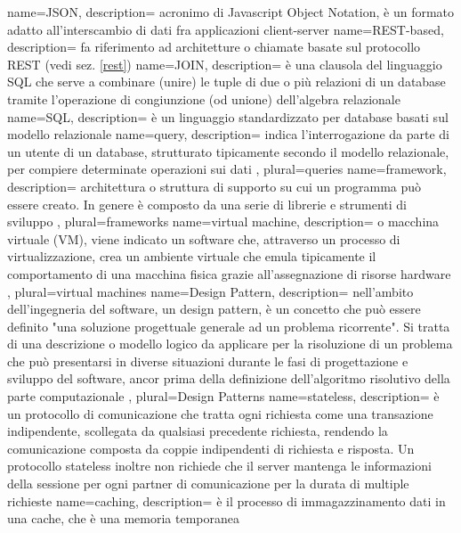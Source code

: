  {
	name=JSON,
	description={  acronimo di Javascript Object Notation, è un formato adatto all'interscambio di dati fra applicazioni client-server
	}
}
 {
	name=REST-based,
	description={ fa riferimento ad architetture o chiamate  basate sul protocollo REST (vedi sez. \ref{rest})
	}
}
 {
	name=JOIN,
	description={  è una clausola del linguaggio SQL che serve a combinare (unire) le tuple di due o più relazioni di un database tramite l'operazione di congiunzione (od unione) dell'algebra relazionale
	}
}
 {
	name=SQL,
	description={ è un linguaggio standardizzato per database basati sul modello relazionale
	}
}
 {
	name=query,
	description={ indica l'interrogazione da parte di un utente di un database, strutturato tipicamente secondo il modello relazionale, per compiere determinate operazioni sui dati
	},
	plural=queries
}
 {
	name=framework,
	description={  architettura o struttura di supporto su cui un programma può essere creato. In genere è composto da una serie di librerie e strumenti di sviluppo
	},
	plural=frameworks
}
 {
	name=virtual machine,
	description={ o macchina virtuale (VM), viene indicato un software che, attraverso un processo di virtualizzazione, crea un ambiente virtuale che emula tipicamente il comportamento di una macchina fisica grazie all'assegnazione di risorse hardware
	},
	plural=virtual machines
}
 {
	name=Design Pattern,
	description={ nell'ambito dell'ingegneria del software, un design pattern, è un concetto che può essere definito "una soluzione progettuale generale ad un problema ricorrente". Si tratta di una descrizione o modello logico da applicare per la risoluzione di un problema che può presentarsi in diverse situazioni durante le fasi di progettazione e sviluppo del software, ancor prima della definizione dell'algoritmo risolutivo della parte computazionale
	},
	plural=Design Patterns
}
 {
	name=stateless,
	description={ è un protocollo di comunicazione che tratta ogni richiesta come una transazione indipendente, scollegata da qualsiasi precedente richiesta, rendendo la comunicazione composta da coppie indipendenti di richiesta e risposta. Un protocollo stateless inoltre non richiede che il server mantenga le informazioni della sessione per ogni partner di comunicazione per la durata di multiple richieste
	}
}
 {
	name=caching,
	description={ è il processo di immagazzinamento dati in una cache, che è una memoria temporanea
	}
}
